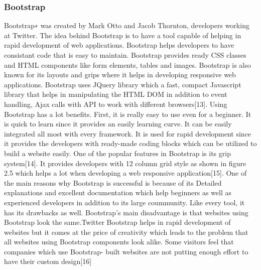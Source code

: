 \subsubsection{Bootstrap}
Bootstrap∗ was created by Mark Otto and Jacob Thornton, developers working at Twitter. The idea behind Bootstrap is to have a tool capable of helping in rapid development of web applications. Bootstrap helps developers to have consistant code that is easy to maintain. Bootstrap provides ready CSS classes and HTML components like form elements, tables and images. Bootstrap is also known for its layouts and grips where it helps in developing responsive web applications. Bootstrap uses JQuery library which a fast, compact Javascript library that helps in manipulating the HTML DOM in addition to event handling, Ajax calls with API to work with different browsers[13].
Using Bootstrap has a lot benefits. First, it is really easy to use even for a beginner. It is quick to learn since it provides an easily learning curve. It can be easily integrated all most with every framework. It is used for rapid development since it provides the developers with ready-made coding blocks which can be utilized to build a website easily. One of the popular features in Bootstrap is its grip system[14]. It provides developers with 12 column grid style as shown in figure 2.5 which helps a lot when developing a web responsive application[15]. One of the main reasons why Bootstrap is successful is because of its Detailed explanations and excellent documentation which help beginners as well as experienced developers in addition to its large coummunity. Like every tool, it has its drawbacks as well. Bootstrap’s main disadvantage is that websites using Bootstrap look the same.Twitter Bootstrap helps in rapid development of websites but it comes at the price of creativity which leads to the problem that all websites using Bootstrap components look alike. Some visitors feel that companies which use Bootstrap- built websites are not putting enough effort to have their custom design[16]
